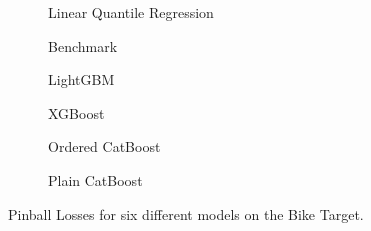 \begin{figure}[htbp]
    \centering
    \begin{subfigure}[b]{0.5\textwidth}
        \centering
        
        \caption{Linear Quantile Regression}
        \label{fig:small-orfe-pinball-bikes}
    \end{subfigure}%
    \begin{subfigure}[b]{0.5\textwidth}
        \centering
        
        \caption{Benchmark}
        \label{fig:armed-play-pinball-bikes}
    \end{subfigure}
    
    \begin{subfigure}[b]{0.5\textwidth}
        \centering
        
        \caption{LightGBM}
        \label{fig:mangy-flux-pinball-bikes}
    \end{subfigure}%
    \begin{subfigure}[b]{0.5\textwidth}
        \centering
        
        \caption{XGBoost}
        \label{fig:couth-ruby-pinball-bikes}
    \end{subfigure}
    
    \begin{subfigure}[b]{0.5\textwidth}
        \centering
        
        \caption{Ordered CatBoost}
        \label{fig:civil-leas-pinball-bikes}
    \end{subfigure}%
    \begin{subfigure}[b]{0.5\textwidth}
        \centering
        
        \caption{Plain CatBoost}
        \label{fig:blear-dita-pinball-bikes}
    \end{subfigure}
    
    \caption{Pinball Losses for six different models on the Bike Target.}
    \label{fig:bikes_pinball}
\end{figure}